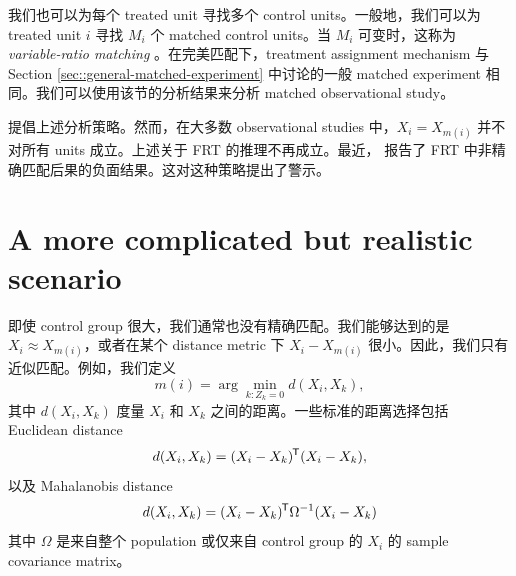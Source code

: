我们也可以为每个 treated unit 寻找多个 control units。一般地，我们可以为 treated unit $i$ 寻找 $M_i$ 个 matched control units。当 $M_i$ 可变时，这称为 {\it variable-ratio matching} \citep{ming2000substantial, ming2001note, pimentel2015variable}。在完美匹配下，treatment assignment mechanism 与 Section \ref{sec::general-matched-experiment} 中讨论的一般 matched experiment 相同。我们可以使用该节的分析结果来分析 matched observational study。


\citet{rosenbaum2002design} 提倡上述分析策略。然而，在大多数 observational studies 中，$X_i = X_{m(i)}$ 并不对所有 units 成立。上述关于 FRT 的推理不再成立。最近，\citet{guo2022statistical} 报告了 FRT 中非精确匹配后果的负面结果。这对这种策略提出了警示。
 


\section{A more complicated but realistic scenario}

即使 control group 很大，我们通常也没有精确匹配。我们能够达到的是 $X_i \approx X_{m(i)}  $，或者在某个 distance metric 下 $X_i -X_{m(i)} $ 很小。因此，我们只有近似匹配。例如，我们定义
$$
m(i) = \arg\min_{k:Z_k = 0} d(X_i ,X_k), 
$$
其中 $d(X_i ,X_k)$ 度量 $X_i$ 和 $X_k$ 之间的距离。一些标准的距离选择包括 Euclidean distance
$$
d(X_i ,X_k) =  (X_i - X_k)^{\mkern-1.5mu\mathsf{T}} ( X_i - X_k),
$$
以及 Mahalanobis distance
$$
d(X_i ,X_k) =(X_i - X_k)^{\mkern-1.5mu\mathsf{T}} \Omega^{-1} (X_i - X_k)
$$
其中 $\Omega$ 是来自整个 population 或仅来自 control group 的 $X_i$ 的 sample covariance matrix。


